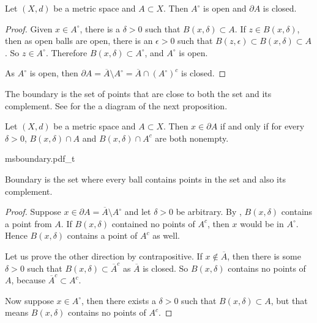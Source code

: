 \begin{prop}
Let $(X,d)$ be a metric space and $A \subset X$.  Then $A^\circ$ is open
and $\partial A$ is closed.
\end{prop}

\begin{proof}
Given $x \in A^\circ$, there is a $\delta > 0$ such that $B(x,\delta)
\subset A$.  If $z \in B(x,\delta)$, then as open balls are open,
there is an $\epsilon > 0$ such that $B(z,\epsilon) \subset B(x,\delta)
\subset A$.  So $z \in A^\circ$.  Therefore $B(x,\delta) \subset
A^\circ$, and $A^\circ$ is open.

As $A^\circ$ is open, then
$\partial A = \overline{A} \setminus A^\circ = \overline{A} \cap
{(A^\circ)}^c$ is closed.
\end{proof}

The boundary is the set of points that are close to both the set and its
complement.  See  for the a diagram
of the next proposition.

\begin{prop}
Let $(X,d)$ be a metric space and $A \subset X$.  Then $x \in \partial A$
if and only if for every $\delta > 0$,
$B(x,\delta) \cap A$ and
$B(x,\delta) \cap A^c$ are both nonempty.
\end{prop}

\begin{myfigureht}
{msboundary.pdf_t}
\caption{Boundary is the set where every ball contains points in the set and
also its complement.\label{fig:msboundary}}
\end{myfigureht}

\begin{proof}
Suppose $x \in \partial A =  \overline{A} \setminus A^\circ$ and
let $\delta > 0$ be arbitrary.
By , $B(x,\delta)$ contains
a point from $A$.  If $B(x,\delta)$ contained no points of $A^c$,
then $x$ would be in $A^\circ$.  Hence $B(x,\delta)$ contains a point of
$A^c$ as well.

Let us prove the other direction by contrapositive.
If $x \notin \overline{A}$, then there is some $\delta > 0$ such that
$B(x,\delta) \subset \overline{A}^c$ as $\overline{A}$ is closed.
So $B(x,\delta)$ contains no points of $A$, because $\overline{A}^c \subset
A^c$.

Now suppose $x \in A^\circ$, then there exists a $\delta > 0$
such that $B(x,\delta) \subset A$, but that means $B(x,\delta)$
contains no points of $A^c$.
\end{proof}

